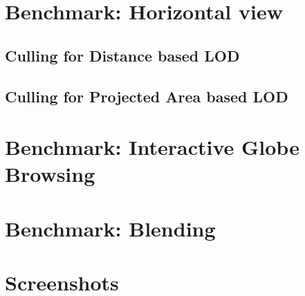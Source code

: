 \section{Benchmark: Horizontal view}

\subsection{Culling for Distance based LOD}

\subsection{Culling for Projected Area based LOD}

\section{Benchmark: Interactive Globe Browsing}

\section{Benchmark: Blending}

\section{Screenshots}
